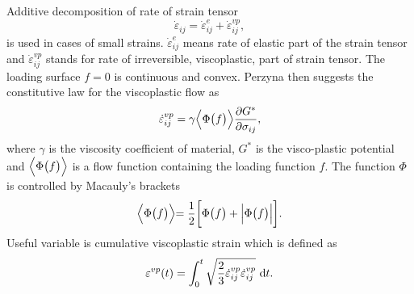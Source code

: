 Additive decomposition  of rate of strain tensor
\begin{equation}
\dot{\varepsilon}_{ij}=\dot{\varepsilon}^e_{ij}+\dot{\varepsilon}^{vp}_{ij},
\label{eq:adddecomp}
\end{equation}
is used in cases of small strains. $\dot{\varepsilon}^e_{ij}$ means rate of elastic  part of the strain tensor
and $\dot{\varepsilon}^{vp}_{ij}$ stands for rate of irreversible, viscoplastic,  part of strain tensor.
The loading surface  $f=0$ is continuous and convex. Perzyna then suggests the constitutive law
for the viscoplastic flow as
\begin{equation}
\dot{\varepsilon}^{vp}_{ij}=\gamma\Bigl\langle\Phi\bigl(f\bigl)\Bigr\rangle\frac{\partial G^*}{\partial\sigma_{ij}},
\label{eq:visplasincr}
\end{equation}
where $\gamma$ is the viscosity coefficient  of material, $G^*$ is the visco-plastic
 potential and
$\Bigl\langle\Phi\bigl(f\bigl)\Bigr\rangle$ is a flow function  containing the loading function $f$.
The function $\Phi$ is controlled by Macauly's  brackets
\begin{equation}
{\Bigl\langle\Phi\bigl(f\bigl)\Bigl\rangle=\frac{1}{2}\biggl[\Phi\bigl(f\bigr)+\Bigl|\Phi\bigl(f\bigr)\Bigr|\biggr]}.
\end{equation}
Useful variable is cumulative viscoplastic strain  which is defined as
\begin{equation}
\varepsilon^{vp}(t)=\displaystyle\int_0^t\sqrt{\frac{2}{3}\dot{\varepsilon}^{vp}_{ij}\dot{\varepsilon}^{vp}_{ij}}\ {\rm d}t.
\label{eq:cumulvisplas}
\end{equation}


